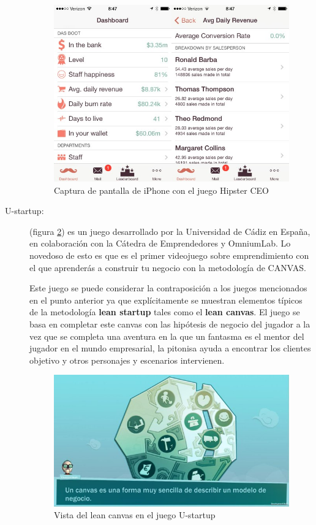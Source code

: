 \begin{description}
\begin{figure}
\begin{center}
\includegraphics[scale=0.6]{imagenes/hipster01.jpg}
\caption{Captura de pantalla de iPhone con el juego Hipster CEO}
\label{hipster01}
\end{center}
\end{figure}

	\item [U-startup:] (figura \ref{ustartup01}) es un juego desarrollado por la Universidad de Cádiz en España, en colaboración con la Cátedra de Emprendedores y OmniumLab. Lo novedoso de esto es que es el primer videojuego sobre emprendimiento con el que aprenderás a construir tu negocio con la metodología de CANVAS. \cite{danieladelbosque2016}
	
Este juego se puede considerar la contraposición a los juegos mencionados en el punto anterior ya que explícitamente se muestran elementos típicos de la metodología \textbf{lean startup} tales como el \textbf{lean canvas}. El juego se basa en completar este canvas con las hipótesis de negocio del jugador a la vez que se completa una aventura en la que un fantasma es el mentor del jugador en el mundo empresarial, la pitonisa ayuda a encontrar los clientes objetivo y otros personajes y escenarios intervienen.
	
\begin{figure}
\begin{center}
\includegraphics[scale=0.6]{imagenes/ustartup01.jpg}
\caption{Vista del lean canvas en el juego U-startup}
\label{ustartup01}
\end{center}
\end{figure}

\end{description}